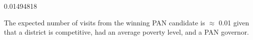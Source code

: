 \documentclass[12pt,letterpaper]{article}
\begin{document}
\begin{enumerate}
	  
	
	\begin{verbnobox}[\footnotesize]
		0.01494818
	\end{verbnobox}		
	
	The expected number of visits from the winning PAN candidate is $\approx$ 0.01 given that a district is competitive, had an average poverty level, and a PAN governor.\\
\end{enumerate}
\end{document}
